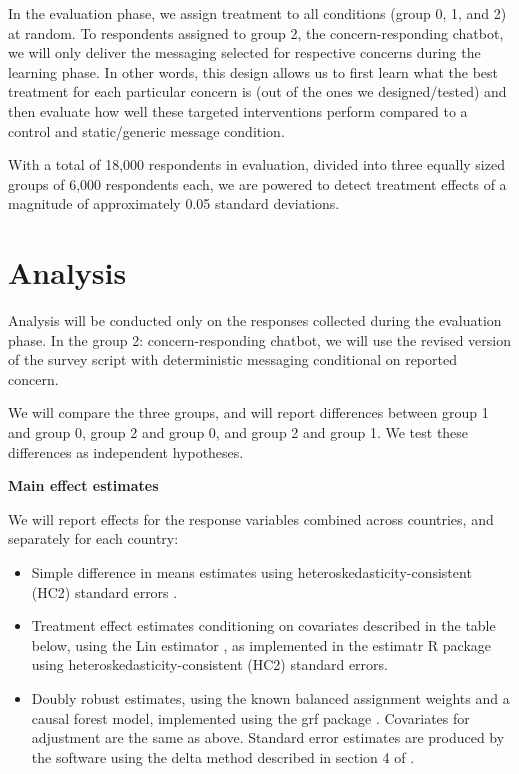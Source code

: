 \documentclass[letterpaper, 12pt, parskip=full,DIV=10]{scrartcl}
\begin{document}
In the evaluation phase, we assign treatment to all conditions (group 0, 1, and 2) at random. To respondents assigned to group 2, the concern-responding chatbot, we will only deliver the messaging selected for respective concerns during the learning phase. In other words, this design allows us to first learn what the best treatment for each particular concern is (out of the ones we designed/tested) and then evaluate how well these targeted interventions perform compared to a control and static/generic message condition.

With a total of 18,000 respondents in evaluation, divided into three equally sized groups of 6,000 respondents each, we are powered to detect treatment effects of a magnitude of approximately 0.05 standard deviations. 


\section{Analysis}
Analysis will be conducted only on the responses collected during the evaluation phase. In the group 2: concern-responding chatbot, we will use the revised version of the survey script with deterministic messaging conditional on reported concern. 

We will compare the three groups, and will report differences between group 1 and group 0, group 2 and group 0, and group 2 and group 1. We test these differences as independent hypotheses. 

\textbf{Main effect estimates}

We will report effects for the response variables combined across countries, and separately for each country:
\begin{itemize}
\item Simple difference in means estimates using heteroskedasticity-consistent (HC2) standard errors \citep{mackinnon1985some}.
\item Treatment effect estimates conditioning on covariates described in the table below, using the Lin estimator \citep{lin2013agnostic}, as implemented in the estimatr R package \citep{blair2021package} using heteroskedasticity-consistent (HC2) standard errors. 
\item Doubly robust estimates, using the known balanced assignment weights and a causal forest model, implemented using the grf package \citep{Tibshirani:2021}. Covariates for adjustment are the same as above. Standard error estimates are produced by the software using the delta method described in section 4 of \cite{athey2019generalized}. 
\end{itemize}
\end{document}
